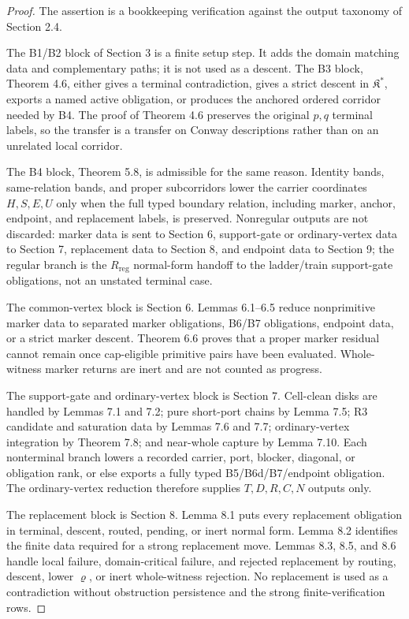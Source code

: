 \documentclass[11pt]{amsart}
\theoremstyle{definition}
\begin{document}
\begin{proof}
The assertion is a bookkeeping verification against the output
taxonomy of Section 2.4.

The B1/B2 block of Section 3 is a finite setup step. It adds the domain
matching data and complementary paths; it is not used as a descent. The B3 block,
Theorem 4.6, either gives a terminal contradiction, gives a strict descent in
\(\mathfrak K^\ast\), exports a named active obligation, or produces the anchored
ordered corridor needed by B4. The proof of Theorem 4.6 preserves the original
\(p,q\) terminal labels, so the transfer is a transfer on Conway descriptions
rather than on an unrelated local corridor.

The B4 block, Theorem 5.8, is admissible for the same reason. Identity bands,
same-relation bands, and proper subcorridors lower the carrier coordinates
\(H,S,E,U\) only when the full typed boundary relation, including marker, anchor,
endpoint, and replacement labels, is preserved. Nonregular outputs are not
discarded: marker data is sent to Section 6, support-gate or ordinary-vertex
data to Section 7, replacement data to Section 8, and endpoint data to Section
9; the regular branch is the \(R_{\mathrm{reg}}\) normal-form handoff to the
ladder/train support-gate obligations, not an unstated terminal case.

The common-vertex block is Section 6. Lemmas 6.1--6.5 reduce nonprimitive marker
data to separated marker obligations, B6/B7 obligations, endpoint data, or a
strict marker descent. Theorem 6.6 proves that a proper marker residual cannot
remain once cap-eligible primitive pairs have been evaluated. Whole-witness
marker returns are inert and are not counted as progress.

The support-gate and ordinary-vertex block is Section 7. Cell-clean disks are
handled by Lemmas 7.1 and 7.2; pure short-port chains by Lemma 7.5; R3 candidate
and saturation data by Lemmas 7.6 and 7.7; ordinary-vertex integration by
Theorem 7.8; and near-whole capture by Lemma 7.10. Each nonterminal branch
lowers a recorded carrier, port, blocker, diagonal, or obligation rank, or else
exports a fully typed B5/B6d/B7/endpoint obligation. The ordinary-vertex reduction
therefore supplies \(T,D,R,C,N\) outputs only.

The replacement block is Section 8. Lemma 8.1 puts every replacement obligation
in terminal, descent, routed, pending, or inert normal form. Lemma 8.2 identifies
the finite data required for a strong replacement move. Lemmas 8.3, 8.5, and
8.6 handle local failure, domain-critical failure, and rejected replacement by
routing, descent, lower \(\varrho\), or inert whole-witness rejection. No
replacement is used as a contradiction without obstruction persistence and the
strong finite-verification rows.


\end{proof}
\end{document}
